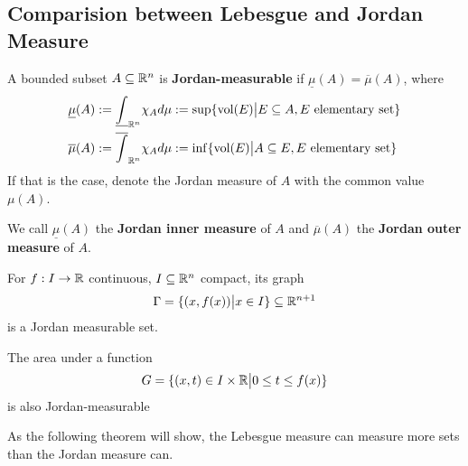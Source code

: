 \subsection{Comparision between Lebesgue and Jordan Measure}

\begin{dfn}[]
  A bounded subset $A \subseteq \mathbb{R}^{n}$ is \textbf{Jordan-measurable} if $\underline{\mu}(A) = \overline{\mu}(A)$, where
\begin{align*}
  \underline{\mu}(A)
  &:=
  \underline{\int}_{\mathbb{R}^{n}} \chi_A d \mu :=
  \sup \{\operatorname{vol}(E)\big\vert E \subseteq A, E \text{ elementary set}\}\\
  \overline{\mu}(A)
  &:=
  \overline{\int}_{\mathbb{R}^n}\chi_A d \mu :=
  \inf \{\operatorname{vol}(E)\big\vert A \subseteq E, E \text{ elementary set}\} 
\end{align*}
If that is the case, denote the Jordan measure of $A$ with the common value $\mu(A)$.


We call $\underline{\mu}(A)$ the \textbf{Jordan inner measure} of $A$ and $\overline{\mu}(A)$ the \textbf{Jordan outer measure} of $A$.
\end{dfn}

\begin{ex}[]
For $f: I \to  \mathbb{R}$ continuous, $I \subseteq \mathbb{R}^{n}$ compact, its graph
\begin{align*}
  \Gamma = \{(x,f(x)) \big\vert x \in I\} \subseteq \mathbb{R}^{n+1}
\end{align*}
is a Jordan measurable set.

The area under a function
\begin{align*}
  G = \{(x,t) \in I \times \mathbb{R} \big\vert 0 \leq t \leq f(x)\}
\end{align*}
is also Jordan-measurable
\end{ex}



As the following theorem will show, 
the Lebesgue measure can measure more sets than the Jordan measure can.

